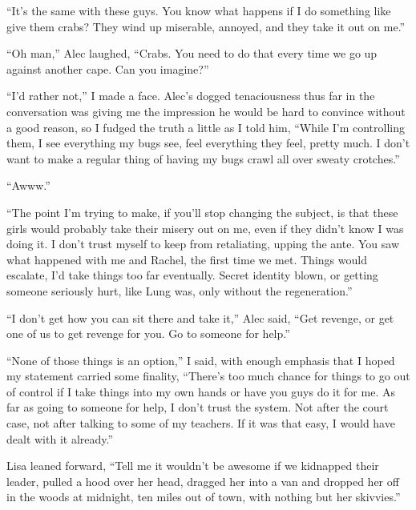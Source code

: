 ``It's the same with these guys.  You know what happens if I do something like give them crabs?  They wind up miserable, annoyed, and they take it out on me.''



``Oh man,'' Alec laughed, ``Crabs.  You need to do that every time we go up against another cape.  Can you imagine?''



``I'd rather not,'' I made a face.  Alec's dogged tenaciousness thus far in the conversation was giving me the impression he would be hard to convince without a good reason, so I fudged the truth a little as I told him, ``While I'm controlling them, I see everything my bugs see, feel everything they feel, pretty much.  I don't want to make a regular thing of having my bugs crawl all over sweaty crotches.''



``Awww.''



``The point I'm trying to make, if you'll stop changing the subject, is that these girls would probably take their misery out on me, even if they didn't know I was doing it.  I don't trust myself to keep from retaliating, upping the ante.  You saw what happened with me and Rachel, the first time we met.  Things would escalate, I'd take things too far eventually.  Secret identity blown, or getting someone seriously hurt, like Lung was, only without the regeneration.''



``I don't get how you can sit there and take it,'' Alec said, ``Get revenge, or get one of us to get revenge for you.  Go to someone for help.''



``None of those things is an option,'' I said, with enough emphasis that I hoped my statement carried some finality, ``There's too much chance for things to go out of control if I take things into my own hands or have you guys do it for me.  As far as going to someone for help, I don't trust the system.  Not after the court case, not after talking to some of my teachers.  If it was that easy, I would have dealt with it already.''



Lisa leaned forward, ``Tell me it wouldn't be awesome if we kidnapped their leader, pulled a hood over her head, dragged her into a van and dropped her off in the woods at midnight, ten miles out of town, with nothing but her skivvies.''



